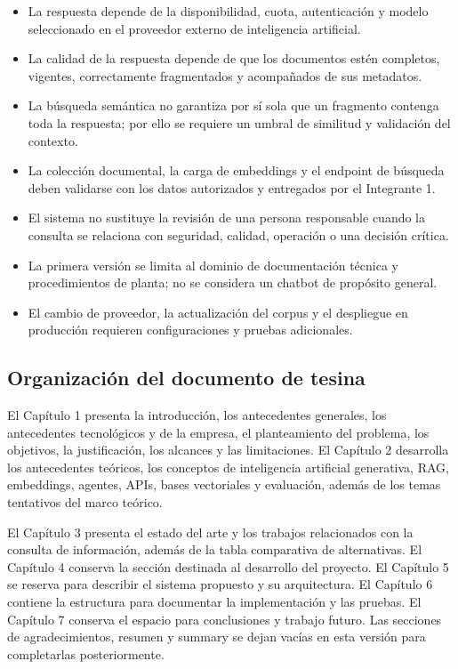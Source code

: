 \begin{itemize}
    \item La respuesta depende de la disponibilidad, cuota, autenticación y modelo seleccionado en el proveedor externo de inteligencia artificial.
    \item La calidad de la respuesta depende de que los documentos estén completos, vigentes, correctamente fragmentados y acompañados de sus metadatos.
    \item La búsqueda semántica no garantiza por sí sola que un fragmento contenga toda la respuesta; por ello se requiere un umbral de similitud y validación del contexto.
    \item La colección documental, la carga de embeddings y el endpoint de búsqueda deben validarse con los datos autorizados y entregados por el Integrante 1.
    \item El sistema no sustituye la revisión de una persona responsable cuando la consulta se relaciona con seguridad, calidad, operación o una decisión crítica.
    \item La primera versión se limita al dominio de documentación técnica y procedimientos de planta; no se considera un chatbot de propósito general.
    \item El cambio de proveedor, la actualización del corpus y el despliegue en producción requieren configuraciones y pruebas adicionales.
\end{itemize}

\subsection{Organización del documento de tesina}

El Capítulo 1 presenta la introducción, los antecedentes generales, los antecedentes tecnológicos y de la empresa, el planteamiento del problema, los objetivos, la justificación, los alcances y las limitaciones. El Capítulo 2 desarrolla los antecedentes teóricos, los conceptos de inteligencia artificial generativa, RAG, embeddings, agentes, APIs, bases vectoriales y evaluación, además de los temas tentativos del marco teórico.

El Capítulo 3 presenta el estado del arte y los trabajos relacionados con la consulta de información, además de la tabla comparativa de alternativas. El Capítulo 4 conserva la sección destinada al desarrollo del proyecto. El Capítulo 5 se reserva para describir el sistema propuesto y su arquitectura. El Capítulo 6 contiene la estructura para documentar la implementación y las pruebas. El Capítulo 7 conserva el espacio para conclusiones y trabajo futuro. Las secciones de agradecimientos, resumen y summary se dejan vacías en esta versión para completarlas posteriormente.
